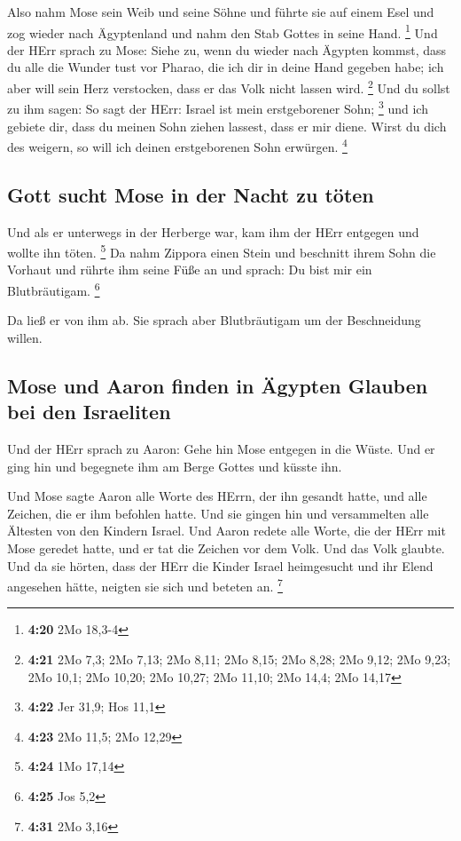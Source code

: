  Also nahm Mose sein Weib und seine Söhne und führte sie
auf einem Esel und zog wieder nach Ägyptenland und nahm den Stab Gottes
in seine Hand. \footnote{\textbf{4:20} 2Mo 18,3-4}  Und
der HErr sprach zu Mose: Siehe zu, wenn du wieder nach Ägypten kommst,
dass du alle die Wunder tust vor Pharao, die ich dir in deine Hand
gegeben habe; ich aber will sein Herz verstocken, dass er das Volk nicht
lassen wird. \footnote{\textbf{4:21} 2Mo 7,3; 2Mo 7,13; 2Mo 8,11; 2Mo
  8,15; 2Mo 8,28; 2Mo 9,12; 2Mo 9,23; 2Mo 10,1; 2Mo 10,20; 2Mo 10,27;
  2Mo 11,10; 2Mo 14,4; 2Mo 14,17}  Und du sollst zu ihm
sagen: So sagt der HErr: Israel ist mein erstgeborener Sohn; \footnote{\textbf{4:22}
  Jer 31,9; Hos 11,1}  und ich gebiete dir, dass du
meinen Sohn ziehen lassest, dass er mir diene. Wirst du dich des
weigern, so will ich deinen erstgeborenen Sohn erwürgen. \footnote{\textbf{4:23}
  2Mo 11,5; 2Mo 12,29}

\hypertarget{gott-sucht-mose-in-der-nacht-zu-tuxf6ten}{%
\subsection{Gott sucht Mose in der Nacht zu
töten}\label{gott-sucht-mose-in-der-nacht-zu-tuxf6ten}}

 Und als er unterwegs in der Herberge war, kam ihm der
HErr entgegen und wollte ihn töten. \footnote{\textbf{4:24} 1Mo 17,14}
 Da nahm Zippora einen Stein und beschnitt ihrem Sohn die
Vorhaut und rührte ihm seine Füße an und sprach: Du bist mir ein
Blutbräutigam. \footnote{\textbf{4:25} Jos 5,2}

 Da ließ er von ihm ab. Sie sprach aber Blutbräutigam um
der Beschneidung willen.

\hypertarget{mose-und-aaron-finden-in-uxe4gypten-glauben-bei-den-israeliten}{%
\subsection{Mose und Aaron finden in Ägypten Glauben bei den
Israeliten}\label{mose-und-aaron-finden-in-uxe4gypten-glauben-bei-den-israeliten}}

 Und der HErr sprach zu Aaron: Gehe hin Mose entgegen in
die Wüste. Und er ging hin und begegnete ihm am Berge Gottes und küsste
ihn.

 Und Mose sagte Aaron alle Worte des HErrn, der ihn
gesandt hatte, und alle Zeichen, die er ihm befohlen hatte.
 Und sie gingen hin und versammelten alle Ältesten von
den Kindern Israel.  Und Aaron redete alle Worte, die der
HErr mit Mose geredet hatte, und er tat die Zeichen vor dem Volk.
 Und das Volk glaubte. Und da sie hörten, dass der HErr
die Kinder Israel heimgesucht und ihr Elend angesehen hätte, neigten sie
sich und beteten an. \footnote{\textbf{4:31} 2Mo 3,16}

